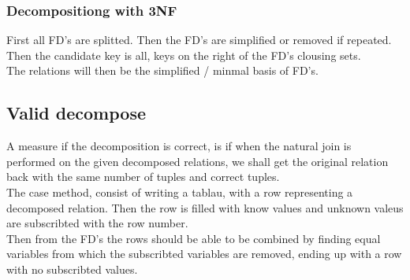 \documentclass[12pt, a4paper]{article}
\begin{document}
			\subsubsection{Decompositiong with 3NF}
				First all FD's are splitted. Then the FD's are simplified or removed if repeated.\\
				Then the candidate key is all, keys on the right of the FD's clousing sets.\\
				The relations will then be the simplified / minmal basis of FD's.
		\subsection{Valid decompose}
			A measure if the decomposition is correct, is if when the natural join is performed on the given decomposed relations, we shall get the original relation back with the same number of tuples and correct tuples.\\
			The case method, consist of writing a tablau, with a row representing a decomposed relation. Then the row is filled with know values and unknown valeus are subscribted with the row number.\\
			Then from the FD's the rows should be able to be combined by finding equal variables from which the subscribted variables are removed, ending up with a row with no subscribted values.
				
\end{document}
